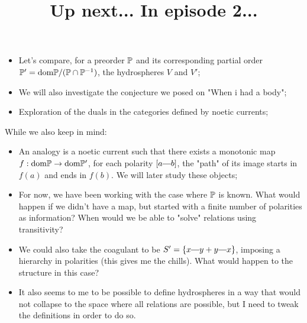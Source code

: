 

\title{Up next... In episode 2...}


	\maketitle
	\begin{itemize}
		\item Let's compare, for a preorder $\mathbb{P}$ and its corresponding partial order $\mathbb{P}' = \text{dom} \mathbb{P}/(\mathbb{P} \cap \mathbb{P}^{-1})$, the hydrospheres $V$ and $V'$;
		\item We will also investigate the conjecture we posed on "When i had a body";
		\item Exploration of the duals in the categories defined by noetic currents;
	\end{itemize}
	While we also keep in mind:
	\begin{itemize}
		\item An analogy is a noetic current such that there exists a monotonic map $f: \text{dom} \mathbb{P} \to \text{dom} \mathbb{P}'$, for each polarity $[a \connect b]$, the "path" of its image starts in $f(a)$ and ends in $f(b)$. We will later study these objects;
		\item For now, we have been working with the case where $\mathbb{P}$ is known. What would happen if we didn't have a map, but started with a finite number of polarities as information? When would we be able to "solve" relations using transitivity?
		\item We could also take the coagulant to be $S' = \{ x \connect y + y \connect x\}$, imposing a hierarchy in polarities (this gives me the chills). What would happen to the structure in this case?
		\item It also seems to me to be possible to define hydrospheres in a way that would not collapse to the space where all relations are possible, but I need to tweak the definitions in order to do so.
	\end{itemize}
